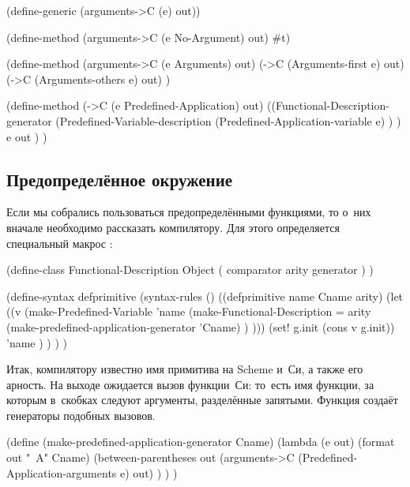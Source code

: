 \begin{code:lisp}
(define-generic (arguments->C (e) out))

(define-method (arguments->C (e No-Argument) out) #t)

(define-method (arguments->C (e Arguments) out)
  (->C (Arguments-first e) out)
  (->C (Arguments-others e) out) )

(define-method (->C (e Predefined-Application) out)
  ((Functional-Description-generator
    (Predefined-Variable-description
     (Predefined-Application-variable e) ) ) e out ) )
\end{code:lisp}


\subsection{Предопределённое окружение}\label{cc/gen/ssect:predef-env}

Если мы собрались пользоваться предопределёнными функциями, то о~них вначале
необходимо рассказать компилятору. Для этого определяется специальный макрос
:

\begin{code:lisp}
(define-class Functional-Description Object
  ( comparator arity generator ) )

(define-syntax defprimitive
  (syntax-rules ()
    ((defprimitive name Cname arity)
     (let ((v (make-Predefined-Variable 'name
               (make-Functional-Description
                = arity
                (make-predefined-application-generator 'Cname) ) )))
       (set! g.init (cons v g.init))
       'name ) ) ) )
\end{code:lisp}

Итак, компилятору известно имя примитива на Scheme и~Си, а также его арность.
На выходе ожидается вызов функции~Си: то~есть имя функции, за которым в~скобках
следуют аргументы, разделённые запятыми. Функция
 создаёт генераторы подобных вызовов.

\begin{code:lisp}
(define (make-predefined-application-generator Cname)
  (lambda (e out)
    (format out "~A" Cname)
    (between-parentheses out
      (arguments->C (Predefined-Application-arguments e) out) ) ) )
\end{code:lisp}

